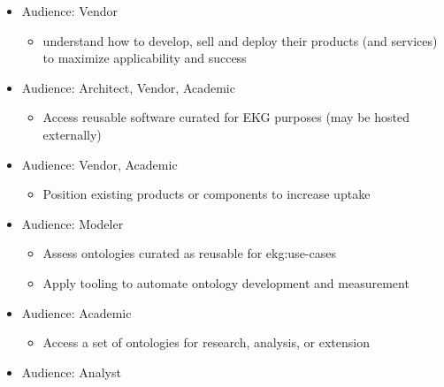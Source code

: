 \begin{description}[font=\bfseries,nosep,leftmargin=!,labelwidth=\widthof{\bfseries Member Directory \& Services}]
\begin{itemize}
\begin{itemize}
            \end{itemize}
            \item Audience: Vendor
            \begin{itemize}
                \item understand how to develop, sell and deploy their products (and services)
                  to maximize applicability and success
            \end{itemize}
        \end{itemize}
    \item[Software]
        \begin{itemize}
            \item Audience: Architect, Vendor, Academic
                \begin{itemize}
                    \item Access reusable software curated for EKG purposes (may be hosted externally)
                \end{itemize}
            \item Audience: Vendor, Academic
                \begin{itemize}
                    \item Position existing products or components to increase uptake
                \end{itemize}
        \end{itemize}
    \item[Ontologies]
        \begin{itemize}
            \item Audience: Modeler
                \begin{itemize}
                    \item Assess ontologies curated as reusable for \glspl{ekg:use-case}
                    \item Apply tooling to automate ontology development and measurement
                \end{itemize}
            \item Audience: Academic
                \begin{itemize}
                    \item Access a set of ontologies for research, analysis, or extension
                \end{itemize}
        \end{itemize}
    \item[Datasets]
        \begin{itemize}
            \item Audience: Analyst

\end{itemize}
\end{description}
